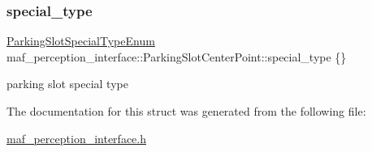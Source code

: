 \subsubsection{\texorpdfstring{special\+\_\+type}{special\_type}}
{\footnotesize\ttfamily \hyperlink{structmaf__perception__interface_1_1ParkingSlotSpecialTypeEnum}{Parking\+Slot\+Special\+Type\+Enum} maf\+\_\+perception\+\_\+interface\+::\+Parking\+Slot\+Center\+Point\+::special\+\_\+type \{\}}



parking slot special type 



The documentation for this struct was generated from the following file\+:\begin{DoxyCompactItemize}
\item 
\hyperlink{maf__perception__interface_8h}{maf\+\_\+perception\+\_\+interface.\+h}\end{DoxyCompactItemize}
